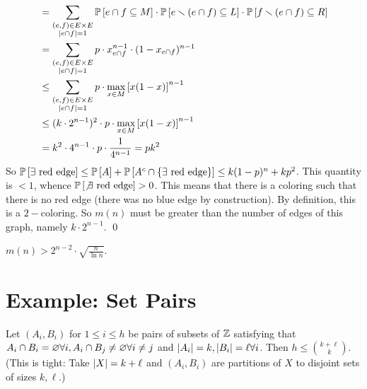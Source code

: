 {\begin{align*}
&= \sum_{\substack{(e,f)\in E\times E\\ \abs {e\cap f}=1}} \P{e\cap f \subseteq M} \cdot\P{e\smallsetminus(e\cap f) \subseteq L} \cdot\P{f\smallsetminus(e\cap f) \subseteq R}\\
&=\sum_{\substack{(e,f)\in E\times E\\ \abs {e\cap f}=1}} p \cdot x_{e\cap f}^{n-1}\cdot (1-x_{e\cap f})^{n-1} \\
&\leq \sum_{\substack{(e,f)\in E\times E\\ \abs {e\cap f}=1}} p \cdot \max_{x\in M}\left[x(1-x)\right]^{n-1} \\
&\leq (k\cdot 2^{n-1})^2 \cdot p \cdot \max_{x\in M}\left[x(1-x)\right]^{n-1}\\
&= k^2 \cdot 4^{n-1}\cdot p\cdot \frac{1}{4^{n-1}} = pk^2
\end{align*}
So $\P{\exists\text{ red edge}} \leq \P A + \P{A^c\cap \set{\exists\text{ red edge}}} \leq k(1-p)^n + kp^2$. This quantity is $<1$, whence $\P{\not\exists\text{ red edge}} >0$. This means that there is a coloring such that there is no red edge (there was no blue edge by construction). By definition, this is a $2-$coloring. So $m(n)$ must be greater than the number of edges of this graph, namely $k\cdot 2^{n-1}$.
\qed}

\begin{cor}
$m(n) > 2^{n-2}\cdot \sqrt{\frac{n}{\ln n}}$.
\end{cor}


\section{Example: Set Pairs}
\begin{thm}[Bollobas] Let $(A_i,B_i)$ for $1\leq i\leq h$ be pairs of subsets of $\Z$ satisfying that $\ds A_i\cap B_i=\varnothing\forall i, A_i\cap B_j\neq \varnothing \forall i\neq j$ and $\abs{A_i}=k,\abs{B_i}=\ell\forall i$. Then $h\leq {k+\ell\choose k}$. \\
(This is tight: Take $\abs{X}=k+\ell$ and $(A_i,B_i)$ are partitions of $X$ to disjoint sets of sizes $k,\ell$.)
\end{thm}

